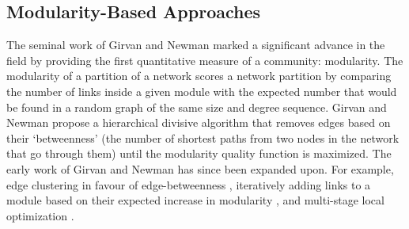 \documentclass{article}
\begin{document}
\subsection{Modularity-Based Approaches}
The seminal work of Girvan and Newman \cite{girvan2002community} marked a significant advance in the field by providing the first quantitative measure of a community: modularity. 
The modularity of a partition of a network 
scores a network partition by comparing the number of links inside a given module with the expected number that would be found in a random graph of the same size and degree sequence. 
Girvan and Newman propose a hierarchical divisive algorithm that removes edges based on their `betweenness' (the number of shortest paths from two nodes in the network that go through them) until the modularity quality function is maximized. 
The early work of Girvan and Newman has since been expanded upon.
For example, edge clustering in favour of edge-betweenness \cite{radicchi2004defining}, iteratively adding links to a module based on their expected increase in modularity \cite{clauset2004finding}, and multi-stage local optimization \cite{blondel2008fast}.

\end{document}
